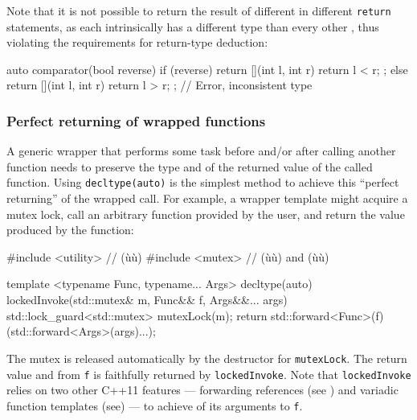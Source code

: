 Note that it is not possible to return the result of different
 in different \lstinline!return! statements, as
each  intrinsically has a different type than
every other , thus violating the requirements
for return-type deduction:

\begin{emcppslisting}[emcppsstandards={c++14}]
auto comparator(bool reverse)
{
    if (reverse)
    {
        return [](int l, int r) { return l < r; };
    }
    else
    {
        return [](int l, int r) { return l > r; };  // Error, inconsistent type
    }
}
\end{emcppslisting}
    

\subsubsection[Perfect returning of wrapped functions]{Perfect returning of wrapped functions}\label{perfect-returning-of-wrapped-functions}

A generic wrapper that performs some task before and/or after calling
another function needs to preserve the type and 
of the returned value of the called function. Using
\lstinline!decltype(auto)! is the simplest method to achieve this ``perfect
returning'' of the wrapped call. For example, a wrapper template might
acquire a mutex lock, call an arbitrary function provided by the user,
and return the value produced by the function:

\begin{emcppslisting}[emcppsstandards={c++14}]
#include <utility>  // (ù{}ù)
#include <mutex>    // (ù{}ù) and (ù{}ù)

template <typename Func, typename... Args>
decltype(auto) lockedInvoke(std::mutex& m, Func&& f, Args&&... args)
{
    std::lock_guard<std::mutex> mutexLock(m);
    return std::forward<Func>(f)(std::forward<Args>(args)...);
}
\end{emcppslisting}
    

\noindent The mutex is released automatically by the destructor for
\lstinline!mutexLock!. The return value and  from
\lstinline!f! is faithfully returned by \lstinline!lockedInvoke!. Note that
\lstinline!lockedInvoke! relies on two other C++11 features --- forwarding
references (see ) and variadic function
templates (see\linebreak[4] ) --- to achieve
 of its arguments to \lstinline!f!.

